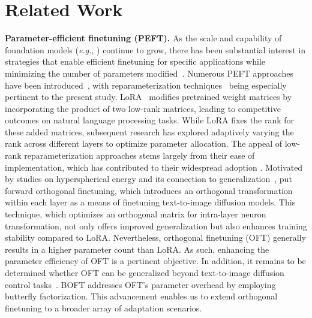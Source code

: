 \section{Related Work}

\textbf{Parameter-efficient finetuning (PEFT).} As the scale and capability of foundation models (\emph{e.g.}, \cite{brown2020language,radford2021learning,rombach2022high,kirillov2023segment}) continue to grow, there has been substantial interest in strategies that enable efficient finetuning for specific applications while minimizing the number of parameters modified~\cite{treviso2023efficient,ding2023parameter,lialin2023scaling}. Numerous PEFT approaches have been introduced~\cite{houlsby2019parameter,aghajanyan2020intrinsic,hulora2022,edalati2022krona,wang2022adamix,gheini2021cross,zaken2022bitfit,guo2020parameter,sung2021training,ansell2022composable,lester2021power,li2021prefix,vu2022spot,he2021towards,mao2021unipelt,karimi2021compacter,liu2022few,sung2022lst,chen2022parameter,jia2022visual,chen2022adaptformer,zhang2022neural,jie2023fact,lian2022scaling,luo2023towards}, with reparameterization techniques~\cite{aghajanyan2020intrinsic,hulora2022,edalati2022krona} being especially pertinent to the present study. LoRA~\cite{hulora2022} modifies pretrained weight matrices by incorporating the product of two low-rank matrices, leading to competitive outcomes on natural language processing tasks. While LoRA fixes the rank for these added matrices, subsequent research \cite{zhang2022adaptive,valipour2022dylora,zhang2023increlora} has explored adaptively varying the rank across different layers to optimize parameter allocation. The appeal of low-rank reparameterization approaches stems largely from their ease of implementation, which has contributed to their widespread adoption \cite{dettmers2023qlora,zi2023delta,chavan2023one}. Motivated by studies on hyperspherical energy and its connection to generalization~\cite{liu2018learning,liu2021orthogonal}, \cite{qiu2023controlling} put forward orthogonal finetuning, which introduces an orthogonal transformation within each layer as a means of finetuning text-to-image diffusion models. This technique, which optimizes an orthogonal matrix for intra-layer neuron transformation, not only offers improved generalization but also enhances training stability compared to LoRA. Nevertheless, orthogonal finetuning (OFT) generally results in a higher parameter count than LoRA. As such, enhancing the parameter efficiency of OFT is a pertinent objective. In addition, it remains to be determined whether OFT can be generalized beyond text-to-image diffusion control tasks~\cite{qiu2023controlling}. BOFT addresses OFT’s parameter overhead by employing butterfly factorization. This advancement enables us to extend orthogonal finetuning to a broader array of adaptation scenarios.

